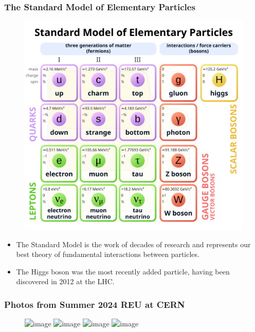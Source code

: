 \documentclass{beamer}
\begin{document}
\begin{frame}
  \frametitle{The Standard Model of Elementary Particles}


  \begin{figure}
    \centering
    \includegraphics[width=0.4\linewidth]{./gfx/standard-model.png}
  \end{figure}

  \begin{itemize}
  \item The Standard Model is the work of decades of research and represents our best theory of fundamental interactions between particles.
  \item The Higgs boson was the most recently added particle, having been discovered in 2012 at the LHC.
  \end{itemize}

\end{frame}



\begin{frame}
  \frametitle{Photos from Summer 2024 REU at CERN}

  \begin{figure}
    \centering
    \includegraphics<1>[width=0.6\linewidth]{./gfx/cern/1.jpg}
    \includegraphics<1>[width=0.6\linewidth]{./gfx/cern/2.jpg}
    \includegraphics<2>[width=0.6\linewidth]{./gfx/cern/3.jpg}
    \includegraphics<2>[width=0.6\linewidth]{./gfx/cern/4.jpg}
  \end{figure}
  
\end{frame}
\end{document}
